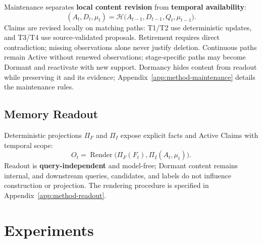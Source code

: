 \documentclass[sigconf,nonacm,balance=false]{acmart}
\begin{document}
Maintenance separates \textbf{local content revision} from \textbf{temporal availability}:
\begin{equation}
    (A_t,D_t,\mu_t)=\mathcal{H}\bigl(A_{t-1},D_{t-1},Q_t,\mu_{t-1}\bigr).
    \label{eq:behaviormem-maintenance}
\end{equation}
Claims are revised locally on matching paths: T1/T2 use deterministic updates, and T3/T4 use source-validated proposals. Retirement requires direct contradiction; missing observations alone never justify deletion. Continuous paths remain Active without renewed observations; stage-specific paths may become Dormant and reactivate with new support. Dormancy hides content from readout while preserving it and its evidence; Appendix~\ref{app:method-maintenance} details the maintenance rules.

\subsection{Memory Readout}
\label{sec:method-readout}

Deterministic projections $\Pi_F$ and $\Pi_I$ expose explicit facts and Active Claims with temporal scope:
\begin{equation}
    O_t=\operatorname{Render}\bigl(\Pi_F(F_t),\Pi_I(A_t,\mu_t)\bigr).
    \label{eq:behaviormem-readout}
\end{equation}
Readout is \textbf{query-independent} and model-free; Dormant content remains internal, and downstream queries, candidates, and labels do not influence construction or projection. The rendering procedure is specified in Appendix~\ref{app:method-readout}.

\section{Experiments}
\label{sec:experiments}
\end{document}
